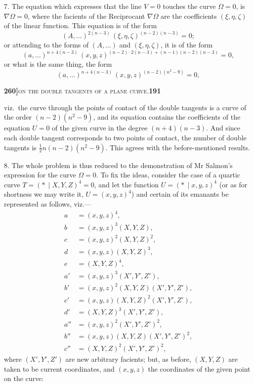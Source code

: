 \documentclass[11pt]{article}
\newcommand{\Cdel}{\mid}
\begin{document}
\medskip

7. The equation which expresses that the line $V = 0$ touches the curve $\Omega = 0$, is $\nabla\Omega = 0$, where the facients of the Reciprocant $\nabla\Omega$ are the coefficients $(\xi, \eta, \zeta)$ of the linear function. This equation is of the form
\[
(A, \ldots)^{2(n-3)}\,(\xi, \eta, \zeta)^{(n-2)(n-3)} = 0;
\]
or attending to the forms of $(A, \ldots)$ and $(\xi, \eta, \zeta)$, it is of the form
\[
(a, \ldots)^{n+4(n-3)}\,(x, y, z)^{(n-2)\cdot 2(n-3) + (n-1)(n-2)(n-3)} = 0,
\]
or what is the same thing, the form
\[
(a, \ldots)^{n+4(n-3)}\,(x, y, z)^{(n-2)(n^2-9)} = 0,
\]

\newpage

\noindent\textbf{260]}\hfill\textsc{on the double tangents of a plane curve.}\hfill\textbf{191}

\medskip

\noindent viz.\ the curve through the points of contact of the double tangents is a curve of the order $(n-2)(n^2-9)$, and its equation contains the coefficients of the equation $U = 0$ of the given curve in the degree $(n+4)(n-3)$. And since each double tangent corresponds to two points of contact, the number of double tangents is $\tfrac{1}{2}n(n-2)(n^2-9)$. This agrees with the before-mentioned results.

\medskip

8. The whole problem is thus reduced to the demonstration of Mr Salmon's expression for the curve $\Omega = 0$. To fix the ideas, consider the case of a quartic curve $T = (*\,\Cdel X, Y, Z)^4 = 0$, and let the function $U = (*\,\Cdel x, y, z)^4$ (or as for shortness we may write it, $U = (x, y, z)^4$) and certain of its emanants be represented as follows, viz.---
\[
\begin{aligned}
a &= (x, y, z)^4,\\
b &= (x, y, z)^3(X, Y, Z),\\
c &= (x, y, z)^2(X, Y, Z)^2,\\
d &= (x, y, z)(X, Y, Z)^3,\\
e &= (X, Y, Z)^4,\\[4pt]
a' &= (x, y, z)^3(X', Y', Z'),\\
b' &= (x, y, z)^2(X, Y, Z)(X', Y', Z'),\\
c' &= (x, y, z)(X, Y, Z)^2(X', Y', Z'),\\
d' &= (X, Y, Z)^3(X', Y', Z'),\\[4pt]
a'' &= (x, y, z)^2(X', Y', Z')^2,\\
b'' &= (x, y, z)(X, Y, Z)(X', Y', Z')^2,\\
c'' &= (X, Y, Z)^2(X', Y', Z')^2,
\end{aligned}
\]
where $(X', Y', Z')$ are new arbitrary facients; but, as before, $(X, Y, Z)$ are taken to be current coordinates, and $(x, y, z)$ the coordinates of the given point on the curve:
\end{document}
